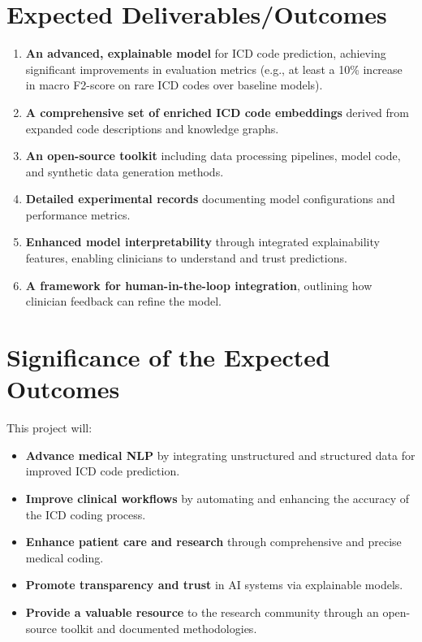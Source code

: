 \documentclass[10pt,a4paper]{article}
\begin{document}
\section{Expected Deliverables/Outcomes}
\begin{enumerate}
    \item \textbf{An advanced, explainable model} for ICD code prediction, achieving significant improvements in evaluation metrics (e.g., at least a 10\% increase in macro F2-score on rare ICD codes over baseline models).
    \item \textbf{A comprehensive set of enriched ICD code embeddings} derived from expanded code descriptions and knowledge graphs.
    \item \textbf{An open-source toolkit} including data processing pipelines, model code, and synthetic data generation methods.
    \item \textbf{Detailed experimental records} documenting model configurations and performance metrics.
    \item \textbf{Enhanced model interpretability} through integrated explainability features, enabling clinicians to understand and trust predictions.
    \item \textbf{A framework for human-in-the-loop integration}, outlining how clinician feedback can refine the model.
\end{enumerate}

\section{Significance of the Expected Outcomes}
This project will:
\begin{itemize}
    \item \textbf{Advance medical NLP} by integrating unstructured and structured data for improved ICD code prediction.
    \item \textbf{Improve clinical workflows} by automating and enhancing the accuracy of the ICD coding process.
    \item \textbf{Enhance patient care and research} through comprehensive and precise medical coding.
    \item \textbf{Promote transparency and trust} in AI systems via explainable models.
    \item \textbf{Provide a valuable resource} to the research community through an open-source toolkit and documented methodologies.
\end{itemize}
\end{document}
